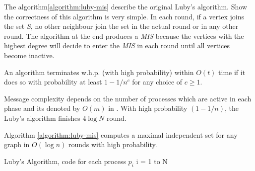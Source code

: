 The algorithm\ref{algorithm:luby-mis} describe the original Luby's algorithm. Show the correctness of this algorithm is very simple. In each round, if a vertex joins the set \textit{S}, no other neighbour join the set in the actual round or in any other round. The algorithm at the end produces a \textit{MIS} because the vertices with the highest degree will decide to enter the \textit{MIS} in each round until all vertices become inactive.



\begin{definition}

An algorithm terminates w.h.p. (with high probability) within $O(t)$ time if it does so with probability at least $1 − 1/n^c$ for any choice of $c ≥ 1$.

\end{definition}

 Message complexity depends on the number of processes which are active in each phase and its denoted by $O(m)$ in \cite{luby1986simple}. With high probability $(1-1/n)$, the Luby's algorithm finishes  $4\log N$ round. 

\begin{theorem}

Algorithm \ref{algorithm:luby-mis} computes a maximal independent set for any graph  in $O(\log n)$  rounds with high probability.

\end{theorem}


\begin{algorithm}
 \caption{Luby's Algorithm, code for each process $p_i$ i = 1 to N}
 \label{algorithm:luby-mis} 

\SetAlgoNoLine
{}
\end{algorithm} 



